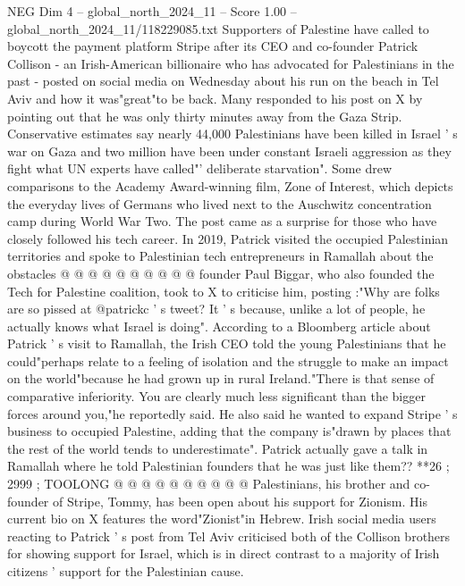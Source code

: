 \begin{textsample}{NEG Dim 4 – global\_north\_2024\_11 – Score 1.00 – global\_north\_2024\_11/118229085.txt}  \label{ex:f4_neg_167}
Supporters of Palestine have called to boycott the payment platform Stripe after its CEO and co-founder Patrick Collison - an Irish-American billionaire who has advocated for Palestinians in the past - posted on social media on Wednesday about his run on the beach in Tel Aviv and how it was"great"to be back.
Many responded to his post on X by pointing out that he was only thirty minutes away from the Gaza Strip.
Conservative estimates say nearly 44,000 Palestinians have been killed in Israel ' s war on Gaza and two million have been under constant Israeli aggression as they fight what UN experts have called"' deliberate starvation".
Some drew comparisons to the Academy Award-winning film, Zone of Interest, which depicts the everyday lives of Germans who lived next to the Auschwitz concentration camp during World War Two.
The post came as a surprise for those who have closely followed his tech career.
In 2019, Patrick visited the occupied Palestinian territories and spoke to Palestinian tech entrepreneurs in Ramallah about the obstacles @ @ @ @ @ @ @ @ @ @ founder Paul Biggar, who also founded the Tech for Palestine coalition, took to X to criticise him, posting :"Why are folks are so pissed at @patrickc ' s tweet?
It ' s because, unlike a lot of people, he actually knows what Israel is doing".
According to a Bloomberg article about Patrick ' s visit to Ramallah, the Irish CEO told the young Palestinians that he could"perhaps relate to a feeling of isolation and the struggle to make an impact on the world"because he had grown up in rural Ireland."There is that sense of comparative inferiority.
You are clearly much less significant than the bigger forces around you,"he reportedly said.
He also said he wanted to expand Stripe ' s business to occupied Palestine, adding that the company is"drawn by places that the rest of the world tends to underestimate".
Patrick actually gave a talk in Ramallah where he told Palestinian founders that he was just like them?? **26 ; 2999 ; TOOLONG @ @ @ @ @ @ @ @ @ @ Palestinians, his brother and co-founder of Stripe, Tommy, has been open about his support for Zionism.
His current bio on X features the word"Zionist"in Hebrew.
Irish social media users reacting to Patrick ' s post from Tel Aviv criticised both of the Collison brothers for showing support for Israel, which is in direct contrast to a majority of Irish citizens ' support for the Palestinian cause.

\end{textsample}
